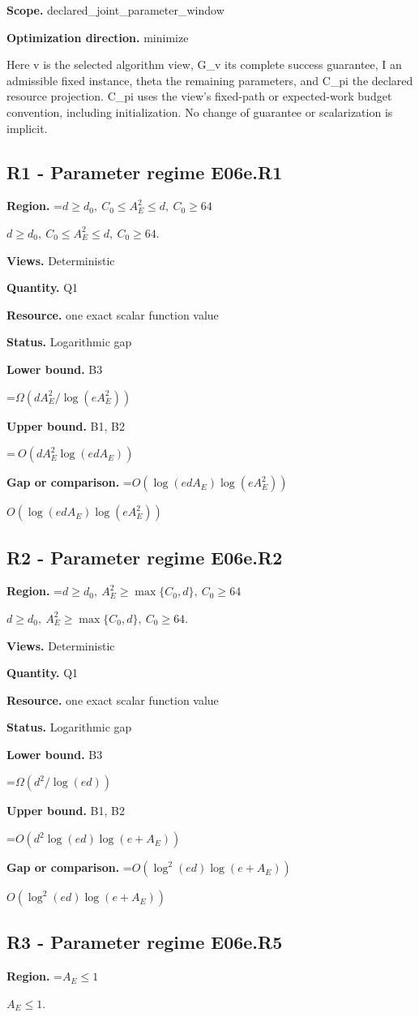 \documentclass[10pt,a4paper]{article}
\newcommand{\AtlasMath}[1]{\par\begingroup\centering\setbox0=\hbox{$\displaystyle #1$}\ifdim\wd0>1.4\linewidth\typeout{ATLAS WIDE FORMULA: \the\wd0}\fi\ifdim\wd0>\linewidth\resizebox{\linewidth}{!}{\box0}\else\box0\fi\par\endgroup}
\newcommand{\AtlasInlineMath}[1]{\begingroup\setbox0=\hbox{$#1$}\ifdim\wd0>.4\linewidth\endgroup\AtlasMath{#1}\else\endgroup$#1$\fi}
\begin{document}
\textbf{Scope.} declared\_joint\_parameter\_window

\textbf{Optimization direction.} minimize

Here v is the selected algorithm view, G\_v its complete success guarantee, I an admissible fixed instance, theta the remaining parameters, and C\_pi the declared resource projection. C\_pi uses the view's fixed-path or expected-work budget convention, including initialization. No change of guarantee or scalarization is implicit.

\subsection{R1 - Parameter regime E06e.R1}
\textbf{Region.} \AtlasInlineMath{d\ge d_0,\ C_0\le A_E^2\le d,\ C_0\ge64}.

\textbf{Views.} Deterministic

\textbf{Quantity.} Q1

\textbf{Resource.} one exact scalar function value

\textbf{Status.} Logarithmic gap

\textbf{Lower bound.} B3

\AtlasMath{\Omega(dA_E^2/\log(eA_E^2))}
\textbf{Upper bound.} B1, B2

\AtlasMath{\ O(dA_E^2\log(edA_E))}
\textbf{Gap or comparison.} \AtlasInlineMath{O(\log(edA_E)\log(eA_E^2))}

\subsection{R2 - Parameter regime E06e.R2}
\textbf{Region.} \AtlasInlineMath{d\ge d_0,\ A_E^2\ge\max\{C_0,d\},\ C_0\ge64}.

\textbf{Views.} Deterministic

\textbf{Quantity.} Q1

\textbf{Resource.} one exact scalar function value

\textbf{Status.} Logarithmic gap

\textbf{Lower bound.} B3

\AtlasMath{\Omega(d^2/\log(ed))}
\textbf{Upper bound.} B1, B2

\AtlasMath{O(d^2\log(ed)\log(e+A_E))}
\textbf{Gap or comparison.} \AtlasInlineMath{O(\log^2(ed)\log(e+A_E))}

\subsection{R3 - Parameter regime E06e.R5}
\textbf{Region.} \AtlasInlineMath{A_E\le1}.
\end{document}
